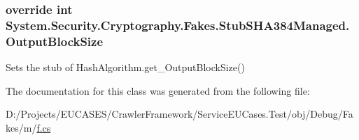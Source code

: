 \hypertarget{class_system_1_1_security_1_1_cryptography_1_1_fakes_1_1_stub_s_h_a384_managed_a3db7c98fd3e00e9679308ceca4216bb3}{
\subsubsection[{Output\-Block\-Size}]{\setlength{\rightskip}{0pt plus 5cm}override int System.\-Security.\-Cryptography.\-Fakes.\-Stub\-S\-H\-A384\-Managed.\-Output\-Block\-Size\hspace{0.3cm}{\ttfamily [get]}}}\label{class_system_1_1_security_1_1_cryptography_1_1_fakes_1_1_stub_s_h_a384_managed_a3db7c98fd3e00e9679308ceca4216bb3}


Sets the stub of Hash\-Algorithm.\-get\-\_\-\-Output\-Block\-Size()



The documentation for this class was generated from the following file\-:\begin{DoxyCompactItemize}
\item 
D\-:/\-Projects/\-E\-U\-C\-A\-S\-E\-S/\-Crawler\-Framework/\-Service\-E\-U\-Cases.\-Test/obj/\-Debug/\-Fakes/m/\hyperlink{m_2f_8cs}{f.\-cs}\end{DoxyCompactItemize}
